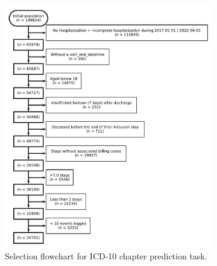 \documentclass[french,12pt,twoside,a4paper]{book}
\begin{document}
\begin{appendices}
\begin{figure}[!h]
\begin{subfigure}[b]{0.5\textwidth}
      \centering
      \includegraphics[width=1.1\textwidth]{img/chapter_3/flowchart_t2_icd10.pdf}
      \caption{Selection flowchart for ICD-10 chapter prediction task.}
      \label{apd:fig:flowchart_t2}
    \end{subfigure}
    \vfill
    \begin{subfigure}[b]{0.5\textwidth}
      \centering

\end{subfigure}
\end{figure}
\end{appendices}
\end{document}
